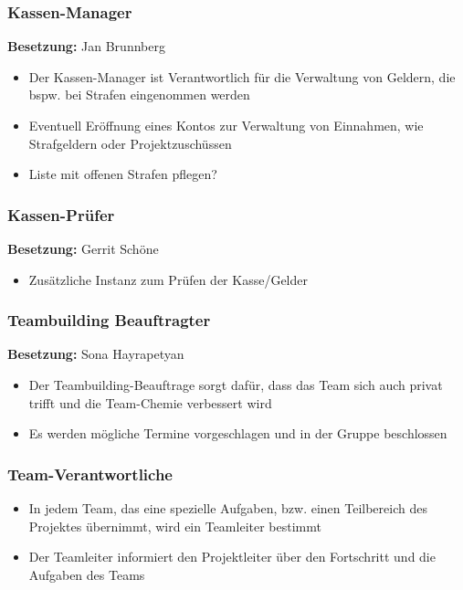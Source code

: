 \subsubsection{Kassen-Manager}
\textbf{Besetzung:} Jan Brunnberg \\
\begin{itemize}
	\item Der Kassen-Manager ist Verantwortlich für die Verwaltung von Geldern, die bspw. bei Strafen eingenommen werden
	\item Eventuell Eröffnung eines Kontos zur Verwaltung von Einnahmen, wie Strafgeldern oder Projektzuschüssen
	\item Liste mit offenen Strafen pflegen?
\end{itemize}

\subsubsection{Kassen-Prüfer}
\textbf{Besetzung:} Gerrit Schöne \\
\begin{itemize}
	\item Zusätzliche Instanz zum Prüfen der Kasse/Gelder
\end{itemize}

\subsubsection{Teambuilding Beauftragter}
\textbf{Besetzung:} Sona Hayrapetyan \\
\begin{itemize}
	\item Der Teambuilding-Beauftrage sorgt dafür, dass das Team sich auch privat trifft und die Team-Chemie verbessert wird
	\item Es werden mögliche Termine vorgeschlagen und in der Gruppe beschlossen 
\end{itemize}

\subsubsection{Team-Verantwortliche}
\begin{itemize}
	\item In jedem Team, das eine spezielle Aufgaben, bzw. einen Teilbereich des Projektes übernimmt, wird ein Teamleiter bestimmt
	\item Der Teamleiter informiert den Projektleiter über den Fortschritt und die Aufgaben des Teams
\end{itemize}

